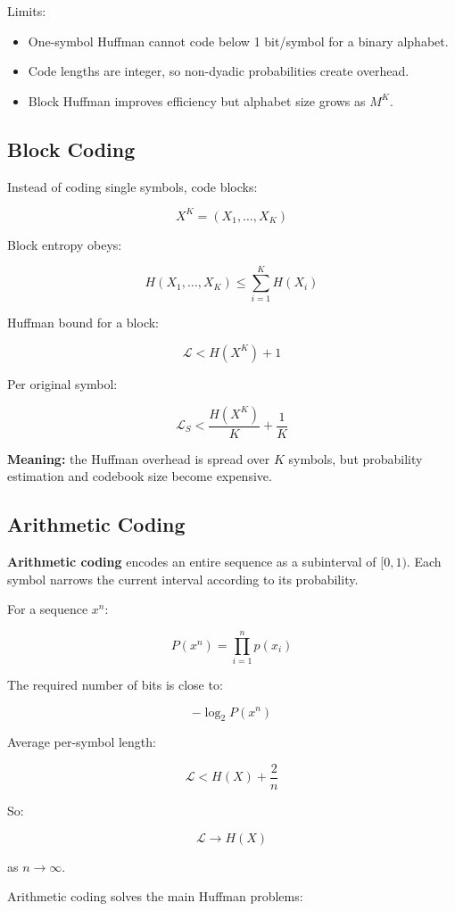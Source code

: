 Limits:

\begin{itemize}
  \item One-symbol Huffman cannot code below 1 bit/symbol for a binary alphabet.
  \item Code lengths are integer, so non-dyadic probabilities create overhead.
  \item Block Huffman improves efficiency but alphabet size grows as $M^K$.
\end{itemize}

\subsection{Block Coding}

Instead of coding single symbols, code blocks:

\[
X^K=(X_1,\ldots,X_K)
\]

Block entropy obeys:

\[
H(X_1,\ldots,X_K)\leq\sum_{i=1}^{K}H(X_i)
\]

Huffman bound for a block:

\[
\mathcal{L}<H(X^K)+1
\]

Per original symbol:

\[
\mathcal{L}_S<\frac{H(X^K)}{K}+\frac{1}{K}
\]

\textbf{Meaning:} the Huffman overhead is spread over $K$ symbols, but probability estimation and codebook size become expensive.

\subsection{Arithmetic Coding}

\textbf{Arithmetic coding} encodes an entire sequence as a subinterval of $[0,1)$. Each symbol narrows the current interval according to its probability.

For a sequence $x^n$:

\[
P(x^n)=\prod_{i=1}^{n}p(x_i)
\]

The required number of bits is close to:

\[
-\log_2P(x^n)
\]

Average per-symbol length:

\[
\mathcal{L}<H(X)+\frac{2}{n}
\]

So:

\[
\mathcal{L}\rightarrow H(X)
\]

as $n\rightarrow\infty$.

Arithmetic coding solves the main Huffman problems:


